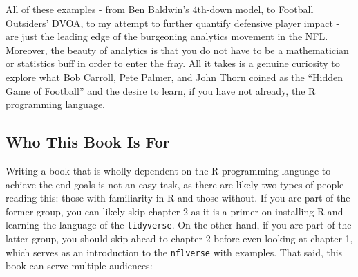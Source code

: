 \documentclass[
  letterpaper,
]{krantz}
\begin{document}
All of these examples - from Ben Baldwin's 4th-down model, to Football
Outsiders' DVOA, to my attempt to further quantify defensive player
impact - are just the leading edge of the burgeoning analytics movement
in the NFL. Moreover, the beauty of analytics is that you do not have to
be a mathematician or statistics buff in order to enter the fray. All it
takes is a genuine curiosity to explore what Bob Carroll, Pete Palmer,
and John Thorn coined as the ``\href{https://amzn.to/3y1GZTO}{Hidden
Game of Football}'' and the desire to learn, if you have not already,
the R programming language.

\hypertarget{who-this-book-is-for}{%
\subsection{Who This Book Is For}\label{who-this-book-is-for}}

Writing a book that is wholly dependent on the R programming language to
achieve the end goals is not an easy task, as there are likely two types
of people reading this: those with familiarity in R and those without.
If you are part of the former group, you can likely skip chapter 2 as it
is a primer on installing R and learning the language of the
\texttt{tidyverse}. On the other hand, if you are part of the latter
group, you should skip ahead to chapter 2 before even looking at chapter
1, which serves as an introduction to the \texttt{nflverse} with
examples. That said, this book can serve multiple audiences:
\end{document}
